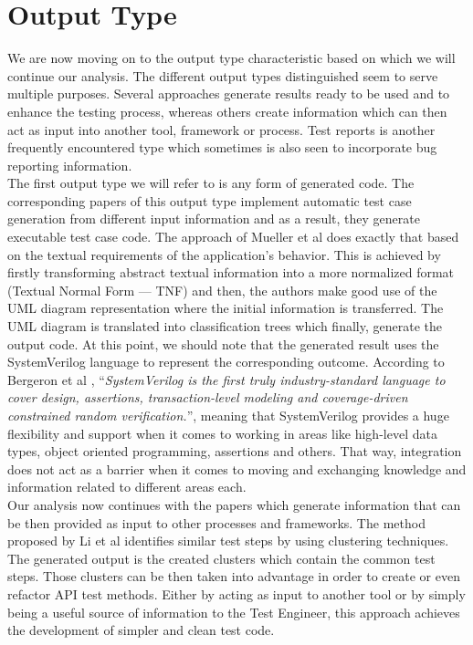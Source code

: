 \section{Output Type}
We are now moving on to the output type characteristic based on which we will continue our analysis. The different output types distinguished seem to serve multiple purposes. Several approaches generate 
results ready to be used and to enhance the testing process, whereas others create information which can then act as input into another tool, framework or process. Test reports is another frequently encountered type 
which sometimes is also seen to incorporate bug reporting information.\\

The first output type we will refer to is any form of generated code. The corresponding papers of this output type implement automatic test case generation from different input information and as a result, 
they generate executable test case code. The approach of Mueller et al \cite{inproceedings} does exactly that based on the textual requirements of the application's behavior. This is achieved by firstly 
transforming abstract textual information into a more normalized format (Textual Normal Form --- TNF) and then, the authors make good use of the UML diagram representation where the initial information 
is transferred. The UML diagram is translated into classification trees which finally, generate the output code. At this point, we should note that the generated result uses the SystemVerilog language 
to represent the corresponding outcome. According to Bergeron et al \cite{bergeron2006verification}, ``\emph{SystemVerilog is the first truly industry-standard language to cover design, assertions, 
transaction-level modeling and coverage-driven constrained random verification.}'', meaning that SystemVerilog provides a huge flexibility and support when it comes to working in areas like high-level data types, 
object oriented programming, assertions and others. That way, integration does not act as a barrier when it comes to moving and exchanging knowledge and information related to different areas each.\\

Our analysis now continues with the papers which generate information that can be then provided as input to other processes and frameworks. The method proposed by Li et al \cite{10.1145/3368089.3417067} 
identifies similar test steps by using clustering techniques. The generated output is the created clusters which contain the common test steps. Those clusters can be then taken into advantage in order 
to create or even refactor API test methods. Either by acting as input to another tool or by simply being a useful source of information to the Test Engineer, this approach achieves the development of 
simpler and clean test code.\\

